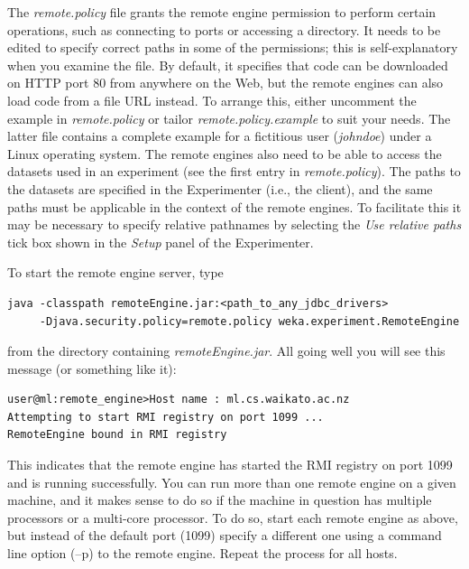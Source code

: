 The \textit{remote.policy} file grants the remote engine permission to
perform certain operations, such as connecting to ports or accessing a
directory. It needs to be edited to specify correct paths in some of
the permissions; this is self-explanatory when you examine the
file. By default, it specifies that code can be downloaded on HTTP
port 80 from anywhere on the Web, but the remote engines can also load
code from a file URL instead. To arrange this, either uncomment the
example in \textit{remote.policy} or tailor
\textit{remote.policy.example} to suit your needs. The latter file
contains a complete example for a fictitious user (\textit{johndoe})
under a Linux operating system. The remote engines also need to be
able to access the datasets used in an experiment (see the first entry
in \textit{remote.policy}). The paths to the datasets are specified in
the Experimenter (i.e., the client), and the same paths must be
applicable in the context of the remote engines. To facilitate this it
may be necessary to specify relative pathnames by selecting the
\textit{Use relative paths} tick box shown in the \textit{Setup} panel
of the Experimenter.

To start the remote engine server, type

\begin{Verbatim}[fontsize=\footnotesize]
java -classpath remoteEngine.jar:<path_to_any_jdbc_drivers>
     -Djava.security.policy=remote.policy weka.experiment.RemoteEngine
\end{Verbatim}

\noindent from the directory containing \textit{remoteEngine.jar}. All going
well you will see this message (or something like it):

\begin{Verbatim}[fontsize=\footnotesize]
user@ml:remote_engine>Host name : ml.cs.waikato.ac.nz 
Attempting to start RMI registry on port 1099 ... 
RemoteEngine bound in RMI registry
\end{Verbatim}

\noindent This indicates that the remote engine has started the RMI
registry on port 1099 and is running successfully. You can run more
than one remote engine on a given machine, and it makes sense to do so
if the machine in question has multiple processors or a multi-core
processor. To do so, start each remote engine as above, but instead of
the default port (1099) specify a different one using a command line
option (--p) to the remote engine. Repeat the process for all hosts.

